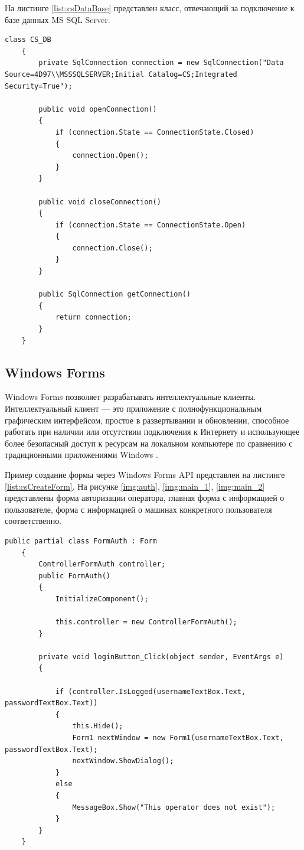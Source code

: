 \vspace{0.1cm}
На листинге \ref{list:csDataBase} представлен класс, отвечающий за подключение к базе данных MS SQL Server.

\begin{lstlisting}[caption=Подключение к базе данных, label = list:csDataBase]
	class CS_DB
	{
		private SqlConnection connection = new SqlConnection("Data Source=4D97\\MSSSQLSERVER;Initial Catalog=CS;Integrated Security=True");
	
		public void openConnection()
		{
			if (connection.State == ConnectionState.Closed)
			{
				connection.Open();
			}    
		}
	
		public void closeConnection()
		{
			if (connection.State == ConnectionState.Open)
			{
				connection.Close();
			}
		}
	
		public SqlConnection getConnection()
		{
			return connection;
		}
	}
\end{lstlisting}

\subsection{Windows Forms}

\vspace{0.5cm}
\hspace{0.6cm}
Windows Forms позволяет разрабатывать интеллектуальные клиенты. Интеллектуальный клиент — это приложение с полнофункциональным графическим интерфейсом, простое в развертывании и обновлении, способное работать при наличии или отсутствии подключения к Интернету и использующее более безопасный доступ к ресурсам на локальном компьютере по сравнению с традиционными приложениями Windows \cite{microsoft-wondowsforms}.

Пример создание формы через Windows Forms API представлен на листинге \ref{list:csCreateForm}. На рисунке \ref{img:auth}, \ref{img:main_1}, \ref{img:main_2} представлены форма авторизации оператора, главная форма с информацией о пользователе, форма с информацией о машинах конкретного пользователя соответственно. 

\begin{lstlisting}[caption=Пример создания формы в программе оператора, label = list:csCreateForm]
	public partial class FormAuth : Form
	{
		ControllerFormAuth controller;
		public FormAuth()
		{
			InitializeComponent();
	
			this.controller = new ControllerFormAuth();
		}
	
		private void loginButton_Click(object sender, EventArgs e)
		{
	
			if (controller.IsLogged(usernameTextBox.Text, passwordTextBox.Text))
			{
				this.Hide();
				Form1 nextWindow = new Form1(usernameTextBox.Text, passwordTextBox.Text);
				nextWindow.ShowDialog();
			}
			else
			{
				MessageBox.Show("This operator does not exist");
			}
		}
	}
\end{lstlisting}

